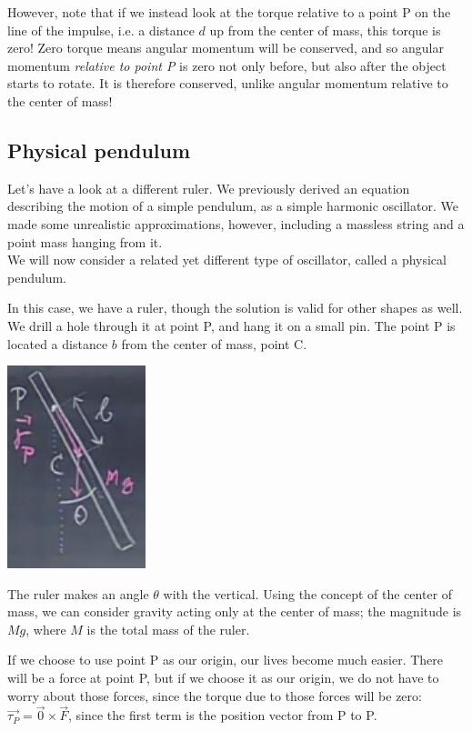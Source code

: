 \documentclass[8.01x]{subfiles}
\begin{document}
However, note that if we instead look at the torque relative to a point P on the line of the impulse, i.e. a distance $d$ up from the center of mass, this torque is zero! Zero torque means angular momentum will be conserved, and so angular momentum \emph{relative to point P} is zero not only before, but also after the object starts to rotate. It is therefore conserved, unlike angular momentum relative to the center of mass!

\subsection{Physical pendulum}

Let's have a look at a different ruler. We previously derived an equation describing the motion of a simple pendulum, as a simple harmonic oscillator. We made some unrealistic approximations, however, including a massless string and a point mass hanging from it.\\
We will now consider a related yet different type of oscillator, called a physical pendulum.

In this case, we have a ruler, though the solution is valid for other shapes as well. We drill a hole through it at point P, and hang it on a small pin. The point P is located a distance $b$ from the center of mass, point C.

\begin{center}
\includegraphics[scale=0.7]{Graphics/lec21_physical_pendulum}
\end{center}

The ruler makes an angle $\theta$ with the vertical. Using the concept of the center of mass, we can consider gravity acting only at the center of mass; the magnitude is $M g$, where $M$ is the total mass of the ruler.

If we choose to use point P as our origin, our lives become much easier. There will be a force at point P, but if we choose it as our origin, we do not have to worry about those forces, since the torque due to those forces will be zero: $\vec{\tau_P} = \vec{0} \times \vec{F}$, since the first term is the position vector from P to P.
\end{document}
